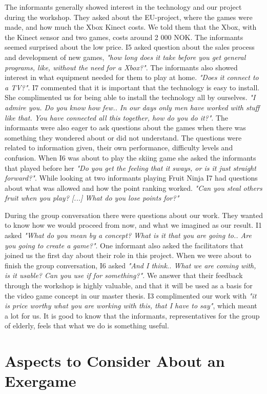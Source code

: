 The informants generally showed interest in the technology and our project during the workshop. They asked about the EU-project, where the games were made, and how much the Xbox Kinect costs. We told them that the Xbox, with the Kinect sensor and two games, costs around 2 000 NOK. The informants seemed surprised about the low price. I5 asked question about the sales process and development of new games, \emph{"how long does it take before you get general programs, like, without the need for a Xbox?"}. The informants also showed interest in what equipment needed for them to play at home. \emph{"Does it connect to a TV?"}. I7 commented that it is important that the technology is easy to install. She complimented us for being able to install the technology all by ourselves. \emph{"I admire you. Do you know how few.. In our days only men have worked with stuff like that. You have connected all this together, how do you do it?"}.  The informants were also eager to ask questions about the games when there was something they wondered about or did not understand. The questions were related to information given, their own performance, difficulty levels and confusion. When I6 was about to play the skiing game she asked the informants that played before her \emph{"Do you get the feeling that it sways, or is it just straight forward?"}. While looking at two informants playing Fruit Ninja I7 had questions about what was allowed and how the point ranking worked. \emph{"Can you steal others fruit when you play? [...] What do you lose points for?"} 

During the group conversation there were questions about our work. They wanted to know how we would proceed from now, and what we imagined as our result. I1 asked \emph{"What do you mean by a concept? What is it that you are going to.. Are you going to create a game?"}. One informant also asked the facilitators that joined us the first day about their role in this project. When we were about to finish the group conversation, I6 asked \emph{"And I think.. What we are coming with, is it usable? Can you use if for something?"}. We answer that their feedback through the workshop is highly valuable, and that it will be used as a basis for the video game concept in our master thesis. I3 complimented our work with \emph{"it is price worthy what you are working with this, that I have to say"}, which meant a lot for us. It is good to know that the informants, representatives for the group of elderly, feels that what we do is something useful.  

\section{Aspects to Consider About an Exergame}
